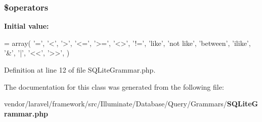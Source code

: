 \subsubsection[{\$operators}]{\setlength{\rightskip}{0pt plus 5cm}\$operators\hspace{0.3cm}{\ttfamily [protected]}}\label{class_illuminate_1_1_database_1_1_query_1_1_grammars_1_1_s_q_lite_grammar_a1a526a18e63270ba6814d699637f22bf}
{\bfseries Initial value\+:}
\begin{DoxyCode}
= array(
        \textcolor{charliteral}{'='}, \textcolor{charliteral}{'<'}, \textcolor{charliteral}{'>'}, \textcolor{stringliteral}{'<='}, \textcolor{stringliteral}{'>='}, \textcolor{stringliteral}{'<>'}, \textcolor{stringliteral}{'!='},
        \textcolor{stringliteral}{'like'}, \textcolor{stringliteral}{'not like'}, \textcolor{stringliteral}{'between'}, \textcolor{stringliteral}{'ilike'},
        \textcolor{charliteral}{'&'}, \textcolor{charliteral}{'|'}, \textcolor{stringliteral}{'<<'}, \textcolor{stringliteral}{'>>'},
    )
\end{DoxyCode}


Definition at line 12 of file S\+Q\+Lite\+Grammar.\+php.



The documentation for this class was generated from the following file\+:\begin{DoxyCompactItemize}
\item 
vendor/laravel/framework/src/\+Illuminate/\+Database/\+Query/\+Grammars/{\bf S\+Q\+Lite\+Grammar.\+php}\end{DoxyCompactItemize}
